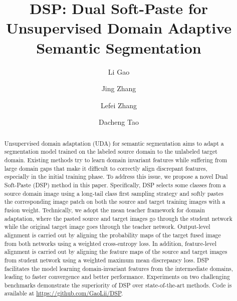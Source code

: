 \documentclass[sigconf]{acmart}
\begin{document}
\fancyhead{}






\title{DSP: Dual Soft-Paste for Unsupervised Domain Adaptive Semantic Segmentation}

\author{Li Gao}

\author{Jing Zhang}


\author{Lefei Zhang}

\author{Dacheng Tao}


\renewcommand{\shortauthors}{Li Gao, et al.}

\begin{abstract}

Unsupervised domain adaptation (UDA) for semantic segmentation aims to adapt a segmentation model trained on the labeled source domain to the unlabeled target domain. Existing methods try to learn domain invariant features while suffering from large domain gaps that make it difficult to correctly align discrepant features, especially in the initial training phase. To address this issue, we propose a novel Dual Soft-Paste (DSP) method in this paper. Specifically, DSP selects some classes from a source domain image using a long-tail class first sampling strategy and softly pastes the corresponding image patch on both the source and target training images with a fusion weight. Technically, we adopt the mean teacher framework for domain adaptation, where the pasted source and target images go through the student network while the original target image goes through the teacher network. Output-level alignment is carried out by aligning the probability maps of the target fused image from both networks using a weighted cross-entropy loss. In addition, feature-level alignment is carried out by aligning the feature maps of the source and target images from student network using a weighted maximum mean discrepancy loss. DSP facilitates the model learning domain-invariant features from the intermediate domains, leading to faster convergence and better performance. Experiments on two challenging benchmarks demonstrate the superiority of DSP over state-of-the-art methods. Code is available at \url{https://github.com/GaoLii/DSP}.

\end{abstract} 
\end{document}
